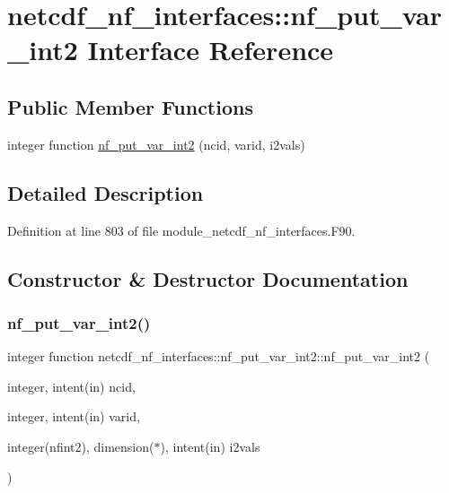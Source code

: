 \hypertarget{interfacenetcdf__nf__interfaces_1_1nf__put__var__int2}{}\section{netcdf\+\_\+nf\+\_\+interfaces\+:\+:nf\+\_\+put\+\_\+var\+\_\+int2 Interface Reference}
\label{interfacenetcdf__nf__interfaces_1_1nf__put__var__int2}
\subsection*{Public Member Functions}
\begin{DoxyCompactItemize}
\item 
integer function \hyperlink{interfacenetcdf__nf__interfaces_1_1nf__put__var__int2_ae045a4815f9a8069ee1b177f4494482d}{nf\+\_\+put\+\_\+var\+\_\+int2} (ncid, varid, i2vals)
\end{DoxyCompactItemize}


\subsection{Detailed Description}


Definition at line 803 of file module\+\_\+netcdf\+\_\+nf\+\_\+interfaces.\+F90.



\subsection{Constructor \& Destructor Documentation}
\mbox{\label{interfacenetcdf__nf__interfaces_1_1nf__put__var__int2_ae045a4815f9a8069ee1b177f4494482d}} 
\subsubsection{\texorpdfstring{nf\+\_\+put\+\_\+var\+\_\+int2()}{nf\_put\_var\_int2()}}
{\footnotesize\ttfamily integer function netcdf\+\_\+nf\+\_\+interfaces\+::nf\+\_\+put\+\_\+var\+\_\+int2\+::nf\+\_\+put\+\_\+var\+\_\+int2 (\begin{DoxyParamCaption}\item[{integer, intent(in)}]{ncid,  }\item[{integer, intent(in)}]{varid,  }\item[{integer(nfint2), dimension($\ast$), intent(in)}]{i2vals }\end{DoxyParamCaption})}



